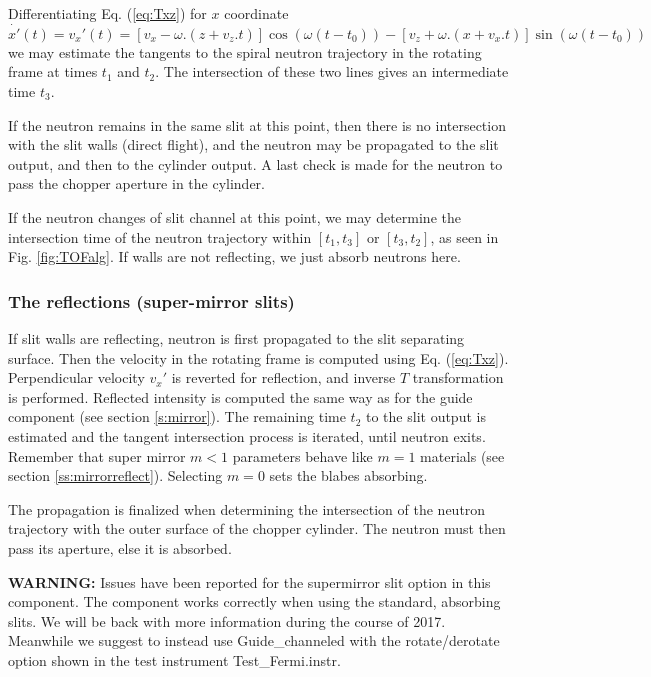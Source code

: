 Differentiating Eq. (\ref{eq:Txz}) for $x$ coordinate
\begin{equation}
\dot{x'}(t) = v_x'(t) = [v_x-\omega.(z+v_z.t)]\cos(\omega(t-t_0)) - [v_z+\omega.(x+v_x.t)]\sin(\omega(t-t_0))
\end{equation}
we may estimate the tangents to the spiral neutron trajectory in the rotating frame at times $t_1$ and $t_2$. The intersection of these two lines gives an intermediate time $t_3$.

If the neutron remains in the same slit at this point, then there is no intersection with the slit walls (direct flight), and the neutron may be propagated to the slit output, and then to the cylinder output. A last check is made for the neutron to pass the chopper aperture in the cylinder.

If the neutron changes of slit channel at this point, we may determine the intersection time of the neutron trajectory within $[ t_1, t_3 ]$ or $[ t_3, t_2 ]$, as seen in Fig. \ref{fig:TOFalg}. If walls are not reflecting, we just absorb neutrons here.

\subsubsection{The reflections (super-mirror slits)}

If slit walls are reflecting, neutron is first propagated to the slit separating surface. Then the velocity in the rotating frame is computed using Eq. (\ref{eq:Txz}). Perpendicular velocity $v_x'$ is reverted for reflection, and inverse $T$ transformation is performed. Reflected intensity is computed the same way as for the guide component (see section \ref{s:mirror}). The remaining time $t_2$ to the slit output is estimated and the tangent intersection process is iterated, until neutron exits. Remember that super mirror $m < 1$ parameters behave like $m=1$ materials (see section \ref{ss:mirrorreflect}). Selecting $m=0$ sets the blabes absorbing.

The propagation is finalized when determining the intersection of the neutron trajectory with the outer surface of the chopper cylinder. The neutron must then pass its aperture, else it is absorbed.

\textbf{WARNING:} Issues have been reported for the supermirror slit option in this component. The component works correctly when using the standard, absorbing slits. We will be back with more information during the course of 2017. Meanwhile we suggest to instead use Guide\_channeled with the rotate/derotate option shown in the test instrument Test\_Fermi.instr. 

